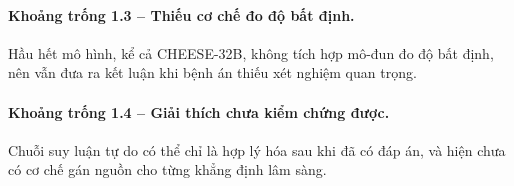 \paragraph{Khoảng trống 1.3 -- Thiếu cơ chế đo độ bất định.}
Hầu hết mô hình, kể cả CHEESE-32B, không tích hợp mô-đun đo độ bất định, nên vẫn đưa ra kết luận khi bệnh án thiếu xét nghiệm quan trọng.

\paragraph{Khoảng trống 1.4 -- Giải thích chưa kiểm chứng được.}
Chuỗi suy luận tự do có thể chỉ là hợp lý hóa sau khi đã có đáp án, và hiện chưa có cơ chế gán nguồn cho từng khẳng định lâm sàng.
